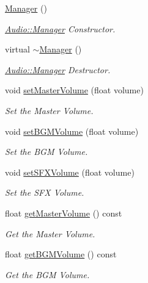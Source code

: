 \begin{DoxyCompactItemize}
\item 
\hyperlink{class_i_dream_sky_1_1_audio_1_1_manager_a016364645e15396221faf0f7bb2e2607}{Manager} ()
\begin{DoxyCompactList}\small\item\em \hyperlink{class_i_dream_sky_1_1_audio_1_1_manager}{Audio\+::\+Manager} Constructor. \end{DoxyCompactList}\item 
virtual \hyperlink{class_i_dream_sky_1_1_audio_1_1_manager_a93f306edbf9dcfc8ff98cd44ec66a903}{$\sim$\+Manager} ()
\begin{DoxyCompactList}\small\item\em \hyperlink{class_i_dream_sky_1_1_audio_1_1_manager}{Audio\+::\+Manager} Destructor. \end{DoxyCompactList}\item 
void \hyperlink{class_i_dream_sky_1_1_audio_1_1_manager_ac7ef14547cf4853a7878f30b98482181}{set\+Master\+Volume} (float volume)
\begin{DoxyCompactList}\small\item\em Set the Master Volume. \end{DoxyCompactList}\item 
void \hyperlink{class_i_dream_sky_1_1_audio_1_1_manager_a0e3cd85c6b28a25a550664ef1b038b0a}{set\+B\+G\+M\+Volume} (float volume)
\begin{DoxyCompactList}\small\item\em Set the B\+GM Volume. \end{DoxyCompactList}\item 
void \hyperlink{class_i_dream_sky_1_1_audio_1_1_manager_a6043ba6ba2844915c60b237c7e0b7e9a}{set\+S\+F\+X\+Volume} (float volume)
\begin{DoxyCompactList}\small\item\em Set the S\+FX Volume. \end{DoxyCompactList}\item 
float \hyperlink{class_i_dream_sky_1_1_audio_1_1_manager_a7c7b1a218649a82da9384e89c2bbc704}{get\+Master\+Volume} () const 
\begin{DoxyCompactList}\small\item\em Get the Master Volume. \end{DoxyCompactList}\item 
float \hyperlink{class_i_dream_sky_1_1_audio_1_1_manager_aaf96945a324146455bda66853533ea56}{get\+B\+G\+M\+Volume} () const 
\begin{DoxyCompactList}\small\item\em Get the B\+GM Volume. \end{DoxyCompactList}\item 

\end{DoxyCompactItemize}

